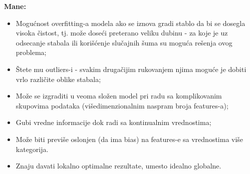 \documentclass[fontsize=12bp, paper=a4]{scrarticle}
\begin{document}

\textbf{Mane:}
\begin{itemize}
    \item Mogućnost overfitting-a modela ako se iznova gradi stablo da bi se dosegla visoka čistost, tj. može doseći preterano veliku dubinu - za koje je uz odsecanje stabala ili korišćenje slučajnih šuma su moguća rešenja ovog problema;
    \item Štete mu outliers-i - svakim drugačijim rukovanjem njima moguće je dobiti vrlo različite oblike stabala;
    \item Može se izgraditi u veoma složen model pri radu sa komplikovanim skupovima podataka (višedimenzionalnim naspram broja features-a);
    \item Gubi vredne informacije dok radi sa kontinualnim vrednostima;
    \item Može biti previše oslonjen (da ima bias) na features-e sa vrednostima više kategorija.
    \item Znaju davati lokalno optimalne rezultate, umesto idealno globalne.
\end{itemize}




\end{document}

